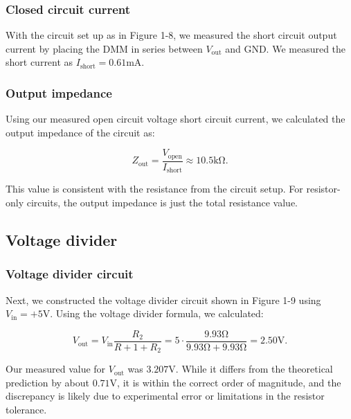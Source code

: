 \documentclass{article}
\begin{document}
\subsubsection{Closed circuit current}

With the circuit set up as in Figure 1-8, we measured the short circuit output
current by placing the DMM in series between $V_\text{out}$ and GND. We measured
the short current as $I_\text{short}=0.61\si{\milli\ampere}$.

\subsubsection{Output impedance}

Using our measured open circuit voltage short circuit current, we calculated
the output impedance of the circuit as:

\begin{equation}
    Z_\text{out}=\frac{V_\text{open}}{I_\text{short}}\approx10.5\si{\kilo\ohm}.
\end{equation}

\noindent This value is consistent with the resistance from the circuit setup. For
resistor-only circuits, the output impedance is just the total resistance value.


\subsection{Voltage divider}

\subsubsection{Voltage divider circuit}

Next, we constructed the voltage divider circuit shown in Figure 1-9 using 
$V_\text{in}=+5\si{\volt}$. Using the voltage divider formula, we calculated:

\begin{equation}
    V_\text{out}=V_\text{in}\frac{R_2}{R+1+R_2}=5\cdot\frac{9.93\si{\ohm}}{9.93\si{\ohm}+9.93\si{\ohm}}=2.50\si{\volt}.
\end{equation}

\noindent Our measured value for $V_\text{out}$ was $3.207\si{\volt}$. While it differs
from the theoretical prediction by about $0.71\si{\volt}$, it is within the correct
order of magnitude, and the discrepancy is likely due to experimental error or limitations
in the resistor tolerance.
\end{document}
